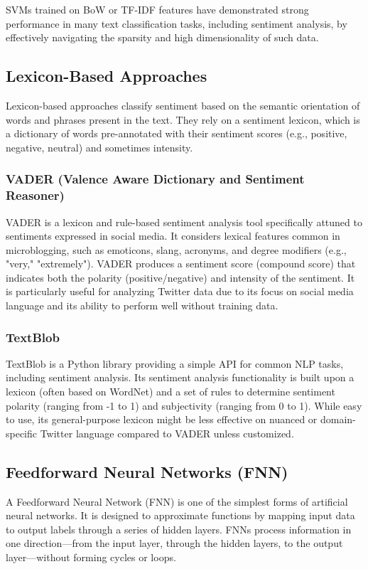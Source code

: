 SVMs trained on BoW or TF-IDF features have demonstrated strong performance in many text classification tasks, including sentiment analysis, by effectively navigating the sparsity and high dimensionality of such data.

\subsection{Lexicon-Based Approaches}
Lexicon-based approaches classify sentiment based on the semantic orientation of words and phrases present in the text. They rely on a sentiment lexicon, which is a dictionary of words pre-annotated with their sentiment scores (e.g., positive, negative, neutral) and sometimes intensity.

\subsubsection{VADER (Valence Aware Dictionary and Sentiment Reasoner)}
VADER is a lexicon and rule-based sentiment analysis tool specifically attuned to sentiments expressed in social media. It considers lexical features common in microblogging, such as emoticons, slang, acronyms, and degree modifiers (e.g., "very," "extremely"). VADER produces a sentiment score (compound score) that indicates both the polarity (positive/negative) and intensity of the sentiment. It is particularly useful for analyzing Twitter data due to its focus on social media language and its ability to perform well without training data.

\subsubsection{TextBlob}
TextBlob is a Python library providing a simple API for common NLP tasks, including sentiment analysis. Its sentiment analysis functionality is built upon a lexicon (often based on WordNet) and a set of rules to determine sentiment polarity (ranging from -1 to 1) and subjectivity (ranging from 0 to 1). While easy to use, its general-purpose lexicon might be less effective on nuanced or domain-specific Twitter language compared to VADER unless customized.

\subsection{Feedforward Neural Networks (FNN)}
A Feedforward Neural Network (FNN) is one of the simplest forms of artificial neural networks. It is designed to approximate functions by mapping input data to output labels through a series of hidden layers. FNNs process information in one direction—from the input layer, through the hidden layers, to the output layer—without forming cycles or loops.

